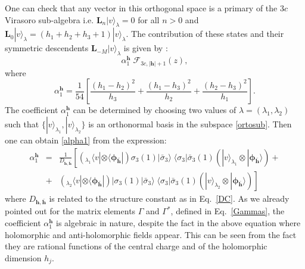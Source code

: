 \documentclass[a4paper,11pt]{article}
\begin{document}
One can check
that any vector in this orthogonal space is a primary of the $3 c$ Virasoro sub-algebra 
i.e. $\boldsymbol{L}_n  |v\rangle_{\lambda}=0$ for all $n>0$
and $\boldsymbol{L}_0|v\rangle_{\lambda} = (h_1+h_2+h_3+1)|v\rangle_{\lambda}$.
The contribution of these states and their symmetric descendents $\boldsymbol{L}_{-M}|v\rangle_{\lambda}$ is given by :
\begin{equation}
\alpha_{1}^{\boldsymbol{h}}\;\mathcal{F}_{3c, |\boldsymbol{h}|+1}(z),
\end{equation}
where 
\begin{equation}
\label{alpha1}
\alpha_{1}^{\boldsymbol{h}} =\frac{1}{54}\left[\frac{(h_1-h_2)^2}{h_3}+\frac{(h_1-h_3)^2}{h_2}+\frac{(h_2-h_3)^2}{h_1}\right].
\end{equation}
The coefficient $\alpha_{1}^{\boldsymbol{h}}$ can  be determined by choosing two values of $\lambda=(\lambda_1,\lambda_2)$  such that 
$\{|v\rangle_{\lambda_1}, |v\rangle_{\lambda_2}\}$ is an orthonormal basis in the subspace \eqref{ortosub}. Then one can obtain \eqref{alpha1} from the expression:
\begin{eqnarray}
 \alpha_1^{\boldsymbol{h}}&=&\frac{1}{D_{\boldsymbol{h},\boldsymbol{\bar{h}}}}\left[(_{\lambda_1}\langle v |\otimes \langle \boldsymbol{\phi}_{\boldsymbol{\bar{h}}}|)\sigma_{3}(1)|\bar{\sigma}_3\rangle \;\langle \sigma_{3}|\bar{\sigma}_3(1) (|v\rangle_{\lambda_1}\otimes |\boldsymbol{\phi}_{\boldsymbol{\bar{h}}}\rangle)  \right.+\\ 
 &+&\left.
 ( _{\lambda_2}\langle v| \otimes \langle \boldsymbol{\phi}_{\boldsymbol{\bar{h}}}|)|\sigma_{3}(1)|\bar{\sigma}_3\rangle \;\langle \sigma_{3}|\bar{\sigma}_3(1)(|v\rangle_{\lambda_2}\otimes |\boldsymbol{\phi}_{\boldsymbol{\bar{h}}}\rangle)  \right]
\end{eqnarray}
where $D_{\boldsymbol{h},\boldsymbol{\bar{h}}}$ is related to the structure constant as in Eq.~\eqref{DC}. As we already pointed out for the matrix elements $\Gamma$ and $\Gamma^*$, defined in Eq.~\eqref{Gammas}, the coefficient $\alpha^{\boldsymbol{h}}_1$  is algebraic in nature, despite the fact in the above equation where holomorphic and anti-holomorphic fields appear. This can be seen from the fact they are rational functions of the central charge and of the holomorphic dimension $h_j$.
\end{document}
